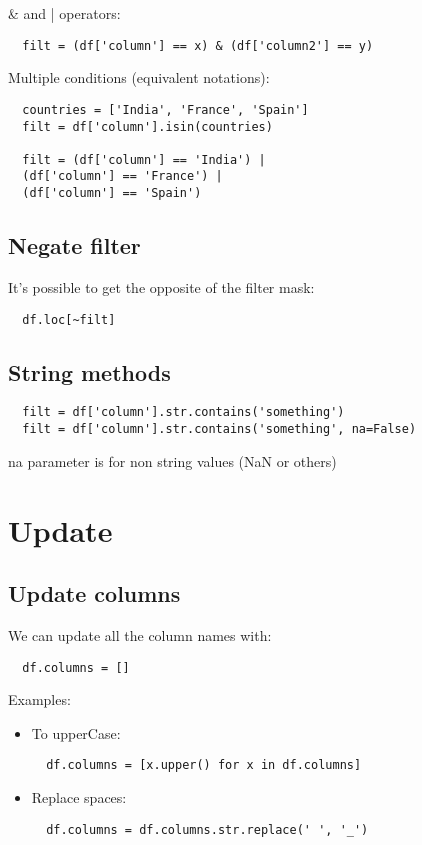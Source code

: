 \documentclass[french]{article}
\begin{document}
\& and | operators:
\begin{verbatim}
  filt = (df['column'] == x) & (df['column2'] == y)
\end{verbatim}

Multiple conditions (equivalent notations):
\begin{verbatim}
  countries = ['India', 'France', 'Spain']
  filt = df['column'].isin(countries)

  filt = (df['column'] == 'India') |
  (df['column'] == 'France') |
  (df['column'] == 'Spain')
\end{verbatim}

\subsection{Negate filter}
It's possible to get the opposite of the filter mask:
\begin{verbatim}
  df.loc[~filt]
\end{verbatim}

\subsection{String methods}

\begin{verbatim}
  filt = df['column'].str.contains('something')
  filt = df['column'].str.contains('something', na=False)
\end{verbatim}
na parameter is for non string values (NaN or others)

\section{Update}

\subsection{Update columns}
We can update all the column names with:
\begin{verbatim}
  df.columns = []
\end{verbatim}

Examples:
\begin{itemize}
\item To upperCase:
\begin{verbatim}
  df.columns = [x.upper() for x in df.columns]
\end{verbatim}

\item Replace spaces:
\begin{verbatim}
  df.columns = df.columns.str.replace(' ', '_')
\end{verbatim}
\end{itemize}
\end{document}
